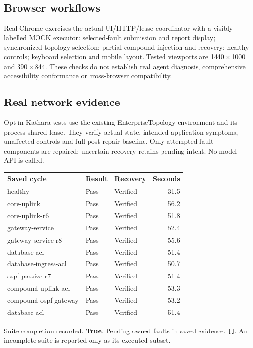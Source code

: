 \documentclass[10pt,a4paper]{article}
\begin{document}
\subsection*{Browser workflows}
Real Chrome exercises the actual UI/HTTP/lease coordinator with a visibly labelled MOCK executor: selected-fault submission and report display; synchronized topology selection; partial compound injection and recovery; healthy controls; keyboard selection and mobile layout. Tested viewports are 1440\,$\times$\,1000 and 390\,$\times$\,844. These checks do not establish real agent diagnosis, comprehensive accessibility conformance or cross-browser compatibility.

\subsection*{Real network evidence}
Opt-in Kathara tests use the existing EnterpriseTopology environment and its process-shared lease. They verify actual state, intended application symptoms, unaffected controls and full post-repair baseline. Only attempted fault components are repaired; uncertain recovery retains pending intent. No model API is called.

\begin{tabularx}{\textwidth}{@{}Xllr@{}}\toprule
Saved cycle & Result & Recovery & Seconds \\
\midrule
healthy & Pass & Verified & 31.5 \\
core-uplink & Pass & Verified & 56.2 \\
core-uplink-r6 & Pass & Verified & 51.8 \\
gateway-service & Pass & Verified & 52.4 \\
gateway-service-r8 & Pass & Verified & 55.6 \\
database-acl & Pass & Verified & 51.4 \\
database-ingress-acl & Pass & Verified & 50.7 \\
ospf-passive-r7 & Pass & Verified & 51.4 \\
compound-uplink-acl & Pass & Verified & 53.3 \\
compound-ospf-gateway & Pass & Verified & 53.2 \\
database-acl & Pass & Verified & 51.4 \\
\bottomrule\end{tabularx}

Suite completion recorded: \textbf{True}. Pending owned faults in saved evidence: \texttt{[]}. An incomplete suite is reported only as its executed subset.
\end{document}
